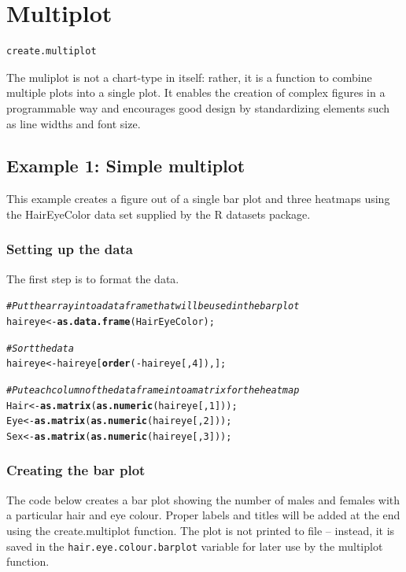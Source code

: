 \documentclass[letterpaper]{article}\usepackage[]{graphicx}\usepackage[]{color}
\makeatletter
\newcommand{\hlnum}[1]{\textcolor[rgb]{0.686,0.059,0.569}{#1}}%
\newcommand{\hlcom}[1]{\textcolor[rgb]{0.678,0.584,0.686}{\textit{#1}}}%
\newcommand{\hlopt}[1]{\textcolor[rgb]{0,0,0}{#1}}%
\newcommand{\hlstd}[1]{\textcolor[rgb]{0.345,0.345,0.345}{#1}}%
\newcommand{\hlkwb}[1]{\textcolor[rgb]{0.69,0.353,0.396}{#1}}%
\newcommand{\hlkwd}[1]{\textcolor[rgb]{0.737,0.353,0.396}{\textbf{#1}}}%
\newenvironment{kframe}{%
 \def\at@end@of@kframe{}%
 \ifinner\ifhmode%
  \def\at@end@of@kframe{\end{minipage}}%
  \begin{minipage}{\columnwidth}%
 \fi\fi%
 \def\FrameCommand##1{\hskip\@totalleftmargin \hskip-\fboxsep
 \colorbox{shadecolor}{##1}\hskip-\fboxsep
     \hskip-\linewidth \hskip-\@totalleftmargin \hskip\columnwidth}%
 \MakeFramed {\advance\hsize-\width
   \@totalleftmargin\z@ \linewidth\hsize
   \@setminipage}}%
 {\par\unskip\endMakeFramed%
 \at@end@of@kframe}
\newenvironment{knitrout}{}{} %
\makeatother
\begin{document}
\section{Multiplot}
\begin{verbatim}
create.multiplot
\end{verbatim}

The muliplot is not a chart-type in itself: rather, it is a function to combine multiple plots into a single plot. It enables the creation of complex figures in a programmable way and encourages good design by standardizing elements such as line widths and font size. 

\subsection{Example 1: Simple multiplot}
This example creates a figure out of a single bar plot and three heatmaps using the HairEyeColor data set supplied by the R datasets package.

\subsubsection{Setting up the data}
The first step is to format the data. 

\begin{knitrout}
\color{fgcolor}\begin{kframe}
\begin{alltt}
\hlcom{# Put the array into a data frame that will be used in the barplot}
\hlstd{haireye} \hlkwb{<-} \hlkwd{as.data.frame}\hlstd{(HairEyeColor);}

\hlcom{# Sort the data}
\hlstd{haireye} \hlkwb{<-} \hlstd{haireye[}\hlkwd{order}\hlstd{(}\hlopt{-}\hlstd{haireye[,}\hlnum{4}\hlstd{]),];}

\hlcom{# Put each column of the dataframe into a matrix for the heatmap}
\hlstd{Hair} \hlkwb{<-} \hlkwd{as.matrix}\hlstd{(}\hlkwd{as.numeric}\hlstd{(haireye[,}\hlnum{1}\hlstd{]));}
\hlstd{Eye} \hlkwb{<-} \hlkwd{as.matrix}\hlstd{(}\hlkwd{as.numeric}\hlstd{(haireye[,}\hlnum{2}\hlstd{]));}
\hlstd{Sex} \hlkwb{<-} \hlkwd{as.matrix}\hlstd{(}\hlkwd{as.numeric}\hlstd{(haireye[,}\hlnum{3}\hlstd{]));}
\end{alltt}
\end{kframe}
\end{knitrout}

\subsubsection{Creating the bar plot}
The code below creates a bar plot showing the number of males and females with a particular hair and eye colour. Proper labels and titles will be added at the end using the create.multiplot function. The plot is not printed to file -- instead, it is saved in the \verb|hair.eye.colour.barplot| variable for later use by the multiplot function.
\end{document}
